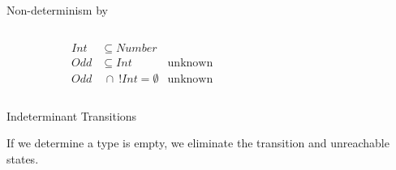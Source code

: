 
\begin{frame}{Non-determinism by }
  \begin{columns}[T]
    \begin{column}{0.35\textwidth}
      \centering
      
      \begin{align*}
        Int&\subseteq Number\\
        Odd&\subseteq Int &\text{unknown}\\
        Odd&~\cap~ !Int = \emptyset &\text{unknown}
      \end{align*}
      \scalebox{0.8}{}
    \end{column}%
    \begin{column}{0.7\textwidth}
      \only<1>{\scalebox{0.6}{}}%
    \end{column}
  \end{columns}

\end{frame}








\newsavebox\classbox
\begin{lrbox}{\classbox}
  \begin{minipage}{5cm}
    
  \end{minipage}
\end{lrbox}

\begin{frame}{Indeterminant Transitions}

  \scalebox{0.8}{}

  If we determine a type is empty, we eliminate the
  transition and unreachable states.
\end{frame}


